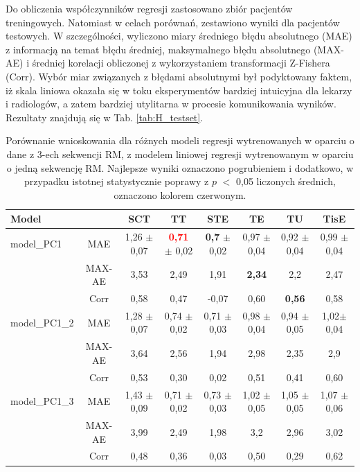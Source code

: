 Do obliczenia współczynników regresji zastosowano zbiór pacjentów treningowych. Natomiast w celach porównań, zestawiono wyniki dla pacjentów testowych. \linebreak W szczególności, wyliczono miary średniego błędu absolutnego (MAE) z informacją na temat błędu średniej, maksymalnego błędu absolutnego (MAX-AE) i średniej korelacji obliczonej z wykorzystaniem transformacji Z-Fishera (Corr). Wybór miar związanych z błędami absolutnymi był podyktowany faktem, iż skala liniowa okazała się w toku eksperymentów bardziej intuicyjna dla lekarzy i radiologów, a zatem bardziej utylitarna w procesie komunikowania wyników. Rezultaty znajdują się w Tab. \ref{tab:H_testset}.
\renewcommand{\arraystretch}{1.2}
\begin{table}[h!]
	\caption{Porównanie wnioskowania dla różnych modeli regresji wytrenowanych w oparciu o dane z 3-ech sekwencji RM, z modelem liniowej regresji wytrenowanym w oparciu o jedną sekwencję RM. Najlepsze wyniki oznaczono pogrubieniem i dodatkowo, w przypadku istotnej statystycznie poprawy z $p$ $<$ 0,05 liczonych średnich, oznaczono kolorem czerwonym.}
	\scriptsize
	\begin{center}
		\begin{tabular}{lc||c|c|c|c|c|c}
			\textbf{Model} & & \textbf{SCT} & \textbf{TT} & \textbf{STE} & \textbf{TE} & \textbf{TU} & \textbf{TisE}\\ 
			
			\hline \hline
			model\_PC1 & MAE & 1,26 $\pm$ 0,07 & \textcolor{red}{\textbf{0,71}} $\pm$ 0,02 & \textbf{0,7} $\pm$ 0,02 & 0,97 $\pm$ 0,04 & 0,92 $\pm$ 0,04 & 0,99 $\pm$ 0,04\\
			&MAX-AE &3,53&2,49&1,91&\textbf{2,34}&2,2&2,47\\
			&Corr &0,58&0,47&-0,07&0,60&\textbf{0,56}&0,58\\
			
			\hline
			model\_PC1\_2 & MAE & 1,28 $\pm$ 0,07 & 0,74 $\pm$ 0,02 & 0,71 $\pm$ 0,03 & 0,98 $\pm$ 0,04 & 0,94 $\pm$ 0,05 & 1,02$\pm$ 0,04\\
			&MAX-AE &3,64&2,56&1,94&2,98&2,35&2,9\\
			&Corr &0,53&0,30&0,02&0,51&0,41&0,60\\
			
			\hline
			model\_PC1\_3&MAE & 1,43 $\pm$ 0,09 & 0,71 $\pm$ 0,02 & 0,73 $\pm$ 0,03 & 1,02 $\pm$ 0,05 & 1,05 $\pm$ 0,05 & 1,07 $\pm$ 0,06\\
			&MAX-AE &3,99&2,49&1,98&3,2&2,96&3,02\\
			&Corr &0,48&0,36&0,03&0,50&0,29&0,62\\
			

\end{tabular}
\end{center}
\end{table}
